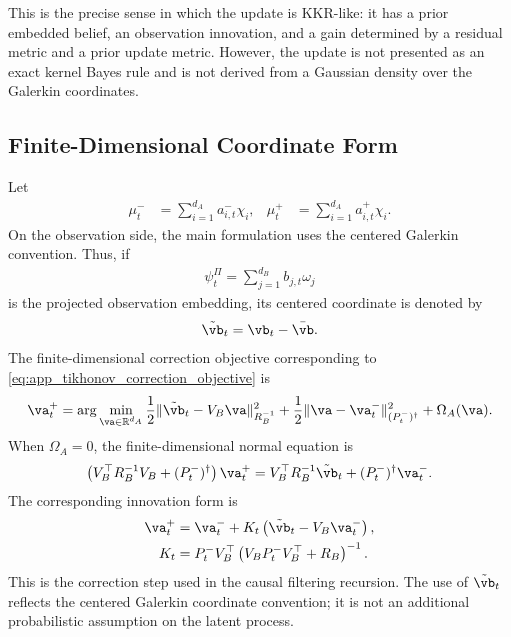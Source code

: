\documentclass[twoside,11pt]{article}
\begin{document}
This is the precise sense in which the update is KKR-like: it has a
prior embedded belief, an observation innovation, and a gain determined
by a residual metric and a prior update metric. However, the update is
not presented as an exact kernel Bayes rule and is not derived from a
Gaussian density over the Galerkin coordinates.

\subsection{Finite-Dimensional Coordinate Form}

Let
\begin{align}
\mu_t^-
&=
\sum_{i=1}^{d_A} a_{i,t}^- \chi_i,
&
\mu_t^+
&=
\sum_{i=1}^{d_A} a_{i,t}^+ \chi_i.
\end{align}
On the observation side, the main formulation uses the centered
Galerkin convention. Thus, if
\begin{align}
\psi_t^\Pi
=
\sum_{j=1}^{d_B} b_{j,t}\omega_j
\end{align}
is the projected observation embedding, its centered coordinate is
denoted by
\begin{align}
\tilde{\vb}_t
=
\vb_t-\bar{\vb}.
\end{align}
The finite-dimensional correction objective corresponding to
\eqref{eq:app_tikhonov_correction_objective} is
\begin{align}
\va_t^+
=
\arg\min_{\va\in\mathbb R^{d_A}}
\frac12
\|\tilde{\vb}_t-V_B\va\|_{R_B^{-1}}^2
+
\frac12
\|\va-\va_t^-\|_{(P_t^-)^\dagger}^2
+
\Omega_A(\va).
\label{eq:app_finite_correction_objective}
\end{align}
When $\Omega_A=0$, the finite-dimensional normal equation is
\begin{align}
\left(
V_B^\top R_B^{-1}V_B
+
(P_t^-)^\dagger
\right)
\va_t^+
=
V_B^\top R_B^{-1}\tilde{\vb}_t
+
(P_t^-)^\dagger\va_t^-.
\label{eq:app_finite_normal_equation}
\end{align}
The corresponding innovation form is
\begin{align}
\va_t^+
&=
\va_t^-
+
K_t
\left(
\tilde{\vb}_t-V_B\va_t^-
\right),
\label{eq:app_finite_innovation}
\\
K_t
&=
P_t^-V_B^\top
\left(
V_BP_t^-V_B^\top+R_B
\right)^{-1}.
\label{eq:app_finite_gain}
\end{align}
This is the correction step used in the causal filtering recursion. The
use of $\tilde{\vb}_t$ reflects the centered Galerkin coordinate
convention; it is not an additional probabilistic assumption on the
latent process.
\end{document}
